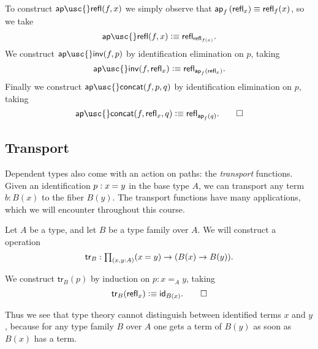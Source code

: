\begin{constr}
To construct $\mathsf{ap\usc{}refl}(f,x)$ we simply observe that ${\ap{f}{\refl{x}}}\jdeq {\refl{f}(x)}$, so we take
\begin{equation*}
\mathsf{ap\usc{}refl}(f,x)\defeq\refl{\refl{f(x)}}.
\end{equation*}
We construct $\mathsf{ap\usc{}inv}(f,p)$ by identification elimination on $p$, taking
\begin{equation*}
\mathsf{ap\usc{}inv}(f,\refl{x}) \defeq \refl{\ap{f}{\refl{x}}}.
\end{equation*}
Finally we construct $\mathsf{ap\usc{}concat}(f,p,q)$ by identification elimination on $p$, taking
\begin{equation*}
\mathsf{ap\usc{}concat}(f,\refl{x},q)  \defeq \refl{\ap{f}{q}}.\qedhere
\end{equation*}
\end{constr}

\subsection{Transport}

Dependent types also come with an action on paths: the \emph{transport} functions.
Given an identification $p:\id{x}{y}$ in the base type $A$, we can transport any term $b:B(x)$ to the fiber $B(y)$.
The transport functions have many applications, which we will encounter throughout this course.

\begin{defn}
Let $A$ be a type, and let $B$ be a type family over $A$.
We will construct a  operation
\begin{equation*}
\mathsf{tr}_B:\prd*{x,y:A} (\id{x}{y})\to (B(x)\to B(y)).
\end{equation*}
\end{defn}

\begin{constr}
We construct $\mathsf{tr}_B(p)$ by induction on $p:x=_A y$, taking
\begin{equation*}
\mathsf{tr}_B(\refl{x}) \defeq \idfunc[B(x)].\qedhere
\end{equation*}
\end{constr}

Thus we see that type theory cannot distinguish between identified terms $x$ and $y$, because for any type family $B$ over $A$ one gets a term of $B(y)$ as soon as $B(x)$ has a term.


